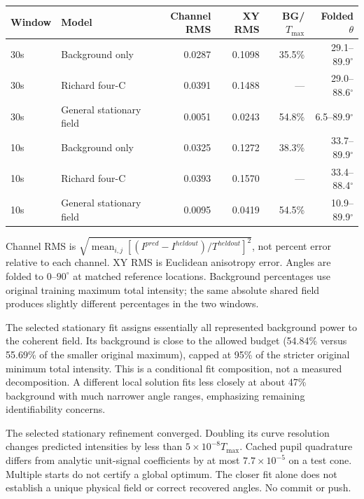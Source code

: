 \documentclass[10pt,a4paper]{article}
\begin{document}
\begin{tabular}{llrrrr}\toprule
Window & Model & Channel RMS & XY RMS & BG/$T_{\max}$ & Folded $\theta$\\\midrule
30s & Background only & 0.0287 & 0.1098 & 35.5\% & 29.1--89.9$^\circ$ \\
30s & Richard four-C & 0.0391 & 0.1488 & --- & 29.0--88.6$^\circ$ \\
30s & General stationary field & 0.0051 & 0.0243 & 54.8\% & 6.5--89.9$^\circ$ \\
10s & Background only & 0.0325 & 0.1272 & 38.3\% & 33.7--89.9$^\circ$ \\
10s & Richard four-C & 0.0393 & 0.1570 & --- & 33.4--88.4$^\circ$ \\
10s & General stationary field & 0.0095 & 0.0419 & 54.5\% & 10.9--89.9$^\circ$ \\
\bottomrule\end{tabular}

Channel RMS is $\sqrt{\operatorname{mean}_{i,j}[(I^{pred}-I^{heldout})/T^{heldout}]^2}$, not percent error relative to each channel. XY RMS is Euclidean anisotropy error. Angles are folded to $0$--$90^\circ$ at matched reference locations. Background percentages use original training maximum total intensity; the same absolute shared field produces slightly different percentages in the two windows.

The selected stationary fit assigns essentially all represented background power to the coherent field. Its background is close to the allowed budget (54.84\% versus 55.69\% of the smaller original maximum), capped at 95\% of the stricter original minimum total intensity. This is a conditional fit composition, not a measured decomposition. A different local solution fits less closely at about 47\% background with much narrower angle ranges, emphasizing remaining identifiability concerns.

The selected stationary refinement converged. Doubling its curve resolution changes predicted intensities by less than $5\times10^{-8}T_{\max}$. Cached pupil quadrature differs from analytic unit-signal coefficients by at most $7.7\times10^{-5}$ on a test cone. Multiple starts do not certify a global optimum. The closer fit alone does not establish a unique physical field or correct recovered angles. No commit or push.
\end{document}
